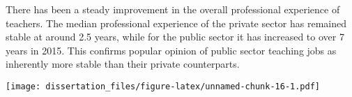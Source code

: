 \documentclass[12pt,]{book}
\newenvironment{Shaded}{\begin{snugshade}}{\end{snugshade}}
\newcommand{\DataTypeTok}[1]{\textcolor[rgb]{0.13,0.29,0.53}{#1}}
\newcommand{\DecValTok}[1]{\textcolor[rgb]{0.00,0.00,0.81}{#1}}
\newcommand{\KeywordTok}[1]{\textcolor[rgb]{0.13,0.29,0.53}{\textbf{#1}}}
\newcommand{\NormalTok}[1]{#1}
\newcommand{\OperatorTok}[1]{\textcolor[rgb]{0.81,0.36,0.00}{\textbf{#1}}}
\newcommand{\StringTok}[1]{\textcolor[rgb]{0.31,0.60,0.02}{#1}}
\begin{document}
There has been a steady improvement in the overall professional experience of teachers. The median professional experience of the private sector has remained stable at around 2.5 years, while for the public sector it has increased to over 7 years in 2015. This confirms popular opinion of public sector teaching jobs as inherently more stable than their private counterparts.

\begin{Shaded}
\end{Shaded}

\texttt{[image: dissertation\_files/figure-latex/unnamed-chunk-16-1.pdf]}
\end{document}
